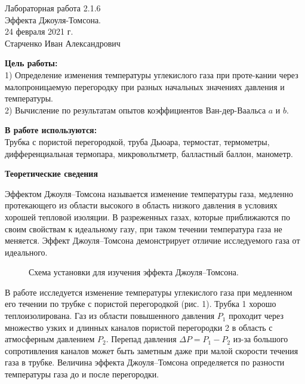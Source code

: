 	



\setcounter{page}{1}



\begin{center}
  \LARGE{Лабораторная работа 2.1.6}\\[0.2cm]
  \LARGE{Эффекта Джоуля-Томсона.}\\[0.2cm]
  \large{24 февраля 2021 г.}\\[0.2cm]
  \large{Старченко Иван Александрович}\\[0.2cm]
\end{center}

\textbf{Цель работы:} \\
1) Определение изменения температуры углекислого газа при проте-кании через малопроницаемую перегородку при разных начальных значениях давления и температуры.\\
2) Вычисление по результатам опытов коэффициентов Ван-дер-Ваальса $a$ и $b$.

\textbf{В работе используются:} \\
Трубка с пористой перегородкой, труба Дьюара, термостат, термометры, дифференциальная термопара, микровольтметр, балластный баллон, манометр.


\begin{center}
	\large{\textbf{Теоретические сведения}}
\end{center}

Эффектом Джоуля–Томсона называется изменение температуры газа, медленно протекающего из области высокого в область низкого давления в условиях хорошей тепловой изоляции. В разреженных газах, которые приближаются по своим свойствам к идеальному газу, при таком течении температура газа не меняется. Эффект Джоуля–Томсона демонстрирует отличие исследуемого газа от идеального.\\

\begin{figure}[h!]
\caption{Схема установки для изучения эффекта Джоуля–Томсона.}
\end{figure}

В работе исследуется изменение температуры углекислого газа при медленном его течении по трубке с пористой перегородкой (рис. 1). Трубка 1 хорошо теплоизолирована. Газ из области повышенного давления $P_1$ проходит через множество узких и длинных каналов пористой перегородки 2 в область с атмосферным давлением $P_2$. Перепад давления $\Delta P = P_1 - P_2$ из-за большого сопротивления каналов может быть заметным даже при малой скорости течения газа в трубке. Величина эффекта Джоуля–Томсона определяется по разности температуры газа до и после перегородки.\\

